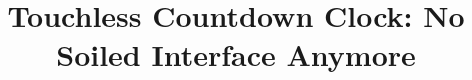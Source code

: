 \documentclass{sig-alternate-ipsn13}
\begin{document}
\title{Touchless Countdown Clock: No Soiled Interface Anymore }
%
%
%
%
%
\end{document}
